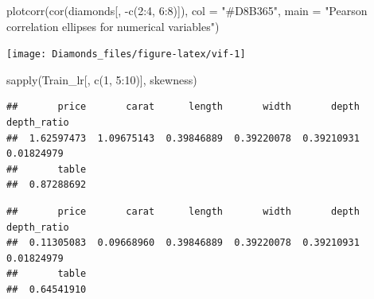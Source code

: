 \documentclass[
]{article}
\newenvironment{Shaded}{\begin{snugshade}}{\end{snugshade}}
\newcommand{\AttributeTok}[1]{\textcolor[rgb]{0.77,0.63,0.00}{#1}}
\newcommand{\DecValTok}[1]{\textcolor[rgb]{0.00,0.00,0.81}{#1}}
\newcommand{\FunctionTok}[1]{\textcolor[rgb]{0.00,0.00,0.00}{#1}}
\newcommand{\NormalTok}[1]{#1}
\newcommand{\OtherTok}[1]{\textcolor[rgb]{0.56,0.35,0.01}{#1}}
\newcommand{\SpecialCharTok}[1]{\textcolor[rgb]{0.00,0.00,0.00}{#1}}
\newcommand{\StringTok}[1]{\textcolor[rgb]{0.31,0.60,0.02}{#1}}
\begin{document}
\begin{Shaded}
\begin{Highlighting}[]
\FunctionTok{plotcorr}\NormalTok{(}\FunctionTok{cor}\NormalTok{(diamonds[, }\SpecialCharTok{{-}}\FunctionTok{c}\NormalTok{(}\DecValTok{2}\SpecialCharTok{:}\DecValTok{4}\NormalTok{, }\DecValTok{6}\SpecialCharTok{:}\DecValTok{8}\NormalTok{)]), }\AttributeTok{col =} \StringTok{"\#D8B365"}\NormalTok{,}
         \AttributeTok{main =} \StringTok{"Pearson correlation ellipses for numerical variables"}\NormalTok{)}
\end{Highlighting}
\end{Shaded}

\begin{center}\texttt{[image: Diamonds\_files/figure-latex/vif-1]} \end{center}

\begin{Shaded}
\begin{Highlighting}[]
\FunctionTok{sapply}\NormalTok{(Train\_lr[, }\FunctionTok{c}\NormalTok{(}\DecValTok{1}\NormalTok{, }\DecValTok{5}\SpecialCharTok{:}\DecValTok{10}\NormalTok{)], skewness)}
\end{Highlighting}
\end{Shaded}

\begin{verbatim}
##       price       carat      length       width       depth depth_ratio 
##  1.62597473  1.09675143  0.39846889  0.39220078  0.39210931  0.01824979 
##       table 
##  0.87288692
\end{verbatim}

\begin{Shaded}
\end{Shaded}

\begin{verbatim}
##       price       carat      length       width       depth depth_ratio 
##  0.11305083  0.09668960  0.39846889  0.39220078  0.39210931  0.01824979 
##       table 
##  0.64541910
\end{verbatim}
\end{document}
